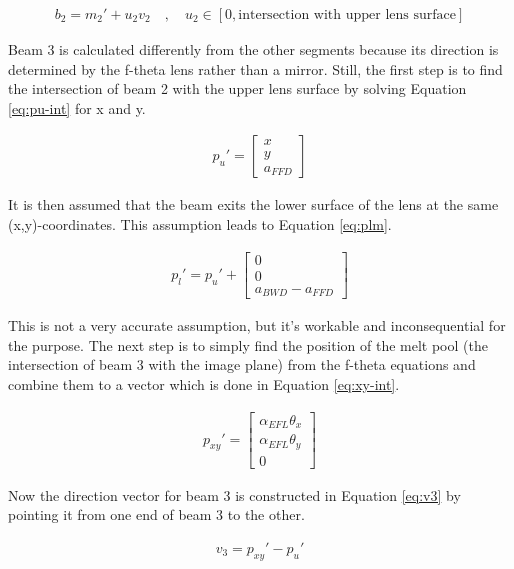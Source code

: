 \begin{align}
    b_2 = m_2' + u_2 v_2 \quad , \quad u_2 \in [0, \text{intersection with upper lens surface}] \label{eq:b2}
\end{align}

Beam 3 is calculated differently from the other segments because its direction is determined by the f-theta lens rather than a mirror. Still, the first step is to find the intersection of beam 2 with the upper lens surface by solving Equation \ref{eq:pu-int} for x and y.

\begin{align}
    p_{u}' =
    \begin{bmatrix}
        x \\
        y \\
        a_{FFD}
    \end{bmatrix}
    \label{eq:pu-int}
\end{align}

It is then assumed that the beam exits the lower surface of the lens at the same (x,y)-coordinates. This assumption leads to Equation \ref{eq:plm}.

\begin{align}
    p_{l}' = p_{u}' + 
    \begin{bmatrix}
        0 \\
        0 \\
        a_{BWD} - a_{FFD}
    \end{bmatrix}
    \label{eq:plm}
\end{align}

This is not a very accurate assumption, but it's workable and inconsequential for the purpose. The next step is to simply find the position of the melt pool (the intersection of beam 3 with the image plane) from the f-theta equations and combine them to a vector which is done in Equation \ref{eq:xy-int}.

\begin{align}
    p_{xy}' =
    \begin{bmatrix}
        \alpha_{EFL} \theta_x \\
        \alpha_{EFL} \theta_y \\
        0
    \end{bmatrix}
    \label{eq:xy-int}
\end{align}

Now the direction vector for beam 3 is constructed in Equation \ref{eq:v3} by pointing it from one end of beam 3 to the other.

\begin{align}
    v_3 = p_{xy}' - p_u' \label{eq:v3}
\end{align}

